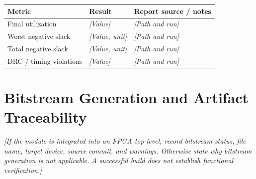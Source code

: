 \begin{tabularx}{\textwidth}{@{}p{37mm}X X@{}}
  \toprule
  Metric & Result & Report source / notes \\
  \midrule
  Final utilization & \textit{[Value]} & \textit{[Path and run]} \\
  Worst negative slack & \textit{[Value, unit]} & \textit{[Path and run]} \\
  Total negative slack & \textit{[Value, unit]} & \textit{[Path and run]} \\
  DRC / timing violations & \textit{[Value]} & \textit{[Path and run]} \\
  \bottomrule
\end{tabularx}

\section{Bitstream Generation and Artifact Traceability}
\textit{[If the module is integrated into an FPGA top-level, record bitstream status, file name, target device, source commit, and warnings. Otherwise state why bitstream generation is not applicable. A successful build does not establish functional verification.]}
